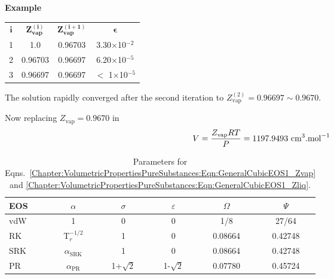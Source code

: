 \begin{MyExample}{\begin{center}{\bf Example}\end{center}}
\begin{enumerate}[a)]
\begin{center}
                     \begin{tabular}{c c c c}
                        \hline
                            $\mathbf{i}$  &  $\mathbf{Z_\text{vap}^{(i)}}$  & $\mathbf{Z_\text{vap}^{(i+1)}}$  & $\mathbf{\epsilon}$ \\  
                               1         &           1.0                 &  0.96703                      &  3.30$\times$10$^{-2}$ \\
                               2         &       0.96703                 &  0.96697                      &  6.20$\times$10$^{-5}$ \\
                               3         &       0.96697                 &  0.96697                      & $<$ 1$\times$10$^{-5}$ \\ 
                        \hline
                     \end{tabular}
                 \end{center}
                 The solution rapidly converged after the second iteration to $Z_{\text{vap}}^{(2)}=0.96697\sim 0.9670$. 
%
           \end{enumerate}
\medskip

           Now replacing $Z_{\text{vap}} = 0.9670$ in 
           \begin{displaymath}
              V=\displaystyle\frac{Z_{\text{vap}}R T}{P} = 1197.9493 \text{ cm}^{3}.\text{mol}^{-1}
           \end{displaymath}
       
   \end{MyExample}


\begin{table}[h]
    \begin{center}
       \begin{tabular}{| l | c c c c c| }
       \hline
          {\bf EOS}  & {\bf $\alpha$} & {\bf $\sigma$}  & {\bf $\varepsilon$} & {\bf $\Omega$} & {\bf $\Psi$ } \\
       \hline
            vdW      & 1              & 0               & 0                  & 1/8            & 27/64          \\
            RK       & T$_{r}^{-1/2}$  & 1                & 0                  & 0.08664       & 0.42748        \\
           SRK       &$\alpha_{\text{SRK}}$& 1            & 0                   & 0.08664       & 0.42748        \\
            PR       &$\alpha_{\text{PR}}$& 1+$\sqrt{2}$   & 1-$\sqrt{2}$        & 0.07780        & 0.45724  \\
       \hline
       \end{tabular}
  \caption{Parameters for Eqns.~\ref{Chapter:VolumetricPropertiesPureSubstances:Eqn:GeneralCubicEOS1_Zvap} and \ref{Chapter:VolumetricPropertiesPureSubstances:Eqn:GeneralCubicEOS1_Zliq}.}\label{Chapter:VolumetricPropertiesPureSubstances:Table:GeneralCubicEOS2}
  \end{center}
\end{table}


